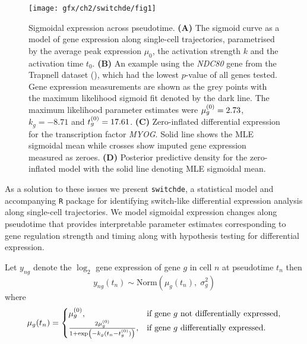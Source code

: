 \begin{figure}[!h]
\centering
\texttt{[image: gfx/ch2/switchde/fig1]}
\caption{Sigmoidal expression across pseudotime.
\textbf{(A)} The sigmoid curve as a model of gene expression along single-cell trajectories, parametrised by the average peak expression $\mu_0$, the activation strength $k$ and the activation time $t_0$.
\textbf{(B)} An example using the \emph{NDC80} gene from the Trapnell dataset (\cite{Trapnell2014-xi}), which had the lowest $p$-value of all genes tested. Gene expression measurements are shown as the grey points with the maximum likelihood sigmoid fit denoted by the dark line. The maximum likelihood parameter estimates were ${\mu^{(0)}_g} = 2.73$, $k_g = -8.71$ and ${t^{(0)}_g} = 17.61$.
\textbf{(C)} Zero-inflated differential expression for the transcription factor \emph{MYOG}. Solid line shows the MLE sigmoidal mean while  crosses show imputed gene expression measured as zeroes.
\textbf{(D)} Posterior predictive density for the zero-inflated model with the solid line denoting MLE sigmoidal mean.
}\label{fig:01}
\end{figure}


As a solution to these issues we present \texttt{switchde}, a statistical model and accompanying \texttt{R} package for identifying switch-like differential expression analysis along single-cell trajectories. We model sigmoidal expression changes along pseudotime that provides interpretable parameter estimates corresponding to gene regulation strength and timing along with hypothesis testing for differential expression.



Let $y_{ng}$ denote the $\log_2$ gene expression of gene $g$ in cell $n$ at pseudotime $t_n$ then
\begin{equation} \label{eq:nzi}
y_{ng}(t_n) \sim \mathrm{Norm}(\mu_g(t_n), \; \sigma_g^2)
\end{equation}
where
\begin{equation}
    \mu_g(t_n) =
\begin{cases}
    \hfil  \mu^{(0)}_g, & \text{if } \text{gene $g$ not differentially expressed},  \\
    \frac{2 \mu^{(0)}_g}{1 + \exp\left(-k_g(t_n - t^{(0)}_g)\right)}, &  \text{if gene $g$ differentially expressed}.
\end{cases}
\end{equation}

